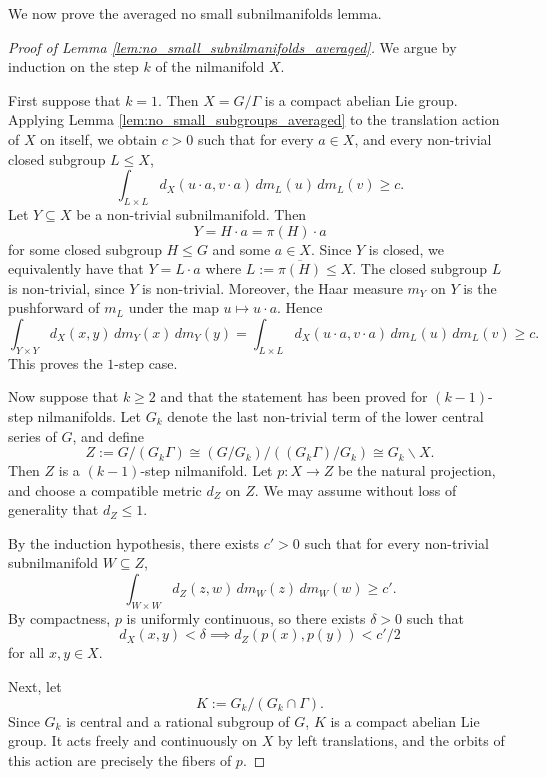 \documentclass[12pt]{amsart}
\theoremstyle{plain}
\theoremstyle{definition}
\begin{document}
We now prove the averaged no small subnilmanifolds lemma.

\begin{proof}[Proof of Lemma \ref{lem:no_small_subnilmanifolds_averaged}]
    We argue by induction on the step $k$ of the nilmanifold $X$.

    First suppose that $k = 1$. 
    Then $X = G/\Gamma$ is a compact abelian Lie group.
    Applying Lemma \ref{lem:no_small_subgroups_averaged} to the translation action of $X$ on itself, we obtain $c > 0$ such that for every $a \in X$, and every non-trivial closed subgroup $L \leq X$, 
    \[
    \int_{L \times L} d_X(u \cdot a, v \cdot a) \,d m_L(u) \,d m_L(v) \geq c. 
    \]
    Let $Y \subseteq X$ be a non-trivial subnilmanifold.
    Then 
    \[
    Y = H \cdot a = \pi(H) \cdot a 
    \]
    for some closed subgroup $H \leq G$ and some $a \in X$. 
    Since $Y$ is closed, we equivalently have that $Y = L\cdot a$ where $L := \overline{\pi(H)} \leq X$.
    The closed subgroup $L$ is non-trivial, since $Y$ is non-trivial. 
    Moreover, the Haar measure $m_Y$ on $Y$ is the pushforward of $m_L$ under the map $u \mapsto u\cdot a$.
    Hence 
    \[
    \int_{Y \times Y} d_X(x,y) \,d m_Y(x) \,d m_Y(y)
    = \int_{L \times L} d_X(u \cdot a, v \cdot a) \,d m_L(u) \,d m_L(v) \geq c.
    \]
    This proves the $1$-step case.

    Now suppose that $k \geq 2$ and that the statement has been proved for $(k-1)$-step nilmanifolds.
    Let $G_k$ denote the last non-trivial term of the lower central series of $G$, and define
    \[
    Z := G/(G_k \Gamma) 
    \cong (G/G_k)/((G_k\Gamma)/G_k) 
    \cong G_k \backslash X.
    \]
    Then $Z$ is a $(k-1)$-step nilmanifold.
    Let $p \colon X \to Z$ be the natural projection, and choose a compatible metric $d_Z$ on $Z$. 
    We may assume without loss of generality that $d_Z \leq 1$.
    
    By the induction hypothesis, there exists $c' >0$ such that for every non-trivial subnilmanifold $W \subseteq Z$,
    \[
    \int_{W \times W} d_Z(z,w) \,d m_W(z) \,d m_W(w) \geq c'. 
    \]
    By compactness, $p$ is uniformly continuous, so there exists $\delta > 0$ such that 
    \[
    d_X(x,y) < \delta \implies d_Z(p(x), p(y)) < c'/2 
    \]
    for all $x,y \in X$.

    Next, let
    \[
    K := G_k/(G_k \cap \Gamma).
    \]
    Since $G_k$ is central and a rational subgroup of $G$, $K$ is a compact abelian Lie group. 
    It acts freely and continuously on $X$ by left translations, and the orbits of this action are precisely the fibers of $p$.


\end{proof}
\end{document}
